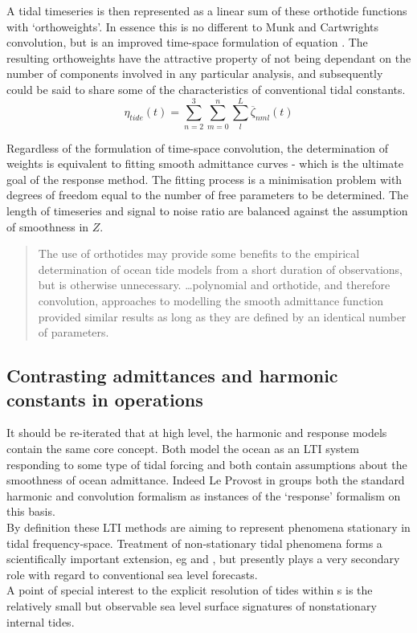 A tidal timeseries is then represented as a linear sum of these orthotide functions with `orthoweights'. In essence this is no different to Munk and Cartwrights convolution, but is an improved time-space formulation of equation \label{E:Z}.  The resulting orthoweights have the attractive property of not being dependant on the number of components involved in any particular analysis, and subsequently could be said to share some of the characteristics of conventional tidal constants.
\begin{equation}
\label{E:orthosum}
\eta_{tide}(t) = \sum_{n=2}^3 \sum_{m=0}^n \sum_{l}^L \overline{\zeta}_{nml}(t)
\end{equation}

Regardless of the formulation of time-space convolution, the determination of weights is equivalent to fitting smooth admittance curves - which is the ultimate goal of the response method.  The fitting process is a minimisation problem with degrees of freedom equal to the number of free parameters to be determined.    The length of timeseries and signal to noise ratio are balanced against the assumption of smoothness in $Z$.
\begin{quotation}   
The use of orthotides may provide some benefits to the empirical determination of ocean tide models from a short duration of observations, but is otherwise unnecessary. \dots  polynomial and orthotide, and therefore convolution, approaches to modelling the smooth admittance function provided similar results as long as they are defined by an identical number of parameters.\citep{Desai:2006wo}
\end{quotation}



\subsection{Contrasting admittances and harmonic constants in operations}

It should be re-iterated that at high level, the harmonic and response models contain the same core concept.   Both model the ocean as an LTI system responding to some type of tidal forcing and both contain assumptions about the smoothness of ocean admittance.  Indeed Le Provost in \citep[chpt6]{Fu:2001ub} groups both the standard harmonic and convolution formalism as instances of the `response' formalism on this basis. \\
By definition these LTI methods are aiming to represent phenomena stationary in tidal frequency-space.  Treatment of non-stationary tidal phenomena forms a scientifically important extension, eg \citep{Colosi:2006va} and \citep{Ray:2011tj}, but presently plays a very secondary role with regard to conventional sea level forecasts.\\
A point of special interest to the explicit resolution of tides within \OGCM{}s is the relatively small but observable sea level surface signatures of nonstationary internal tides.




